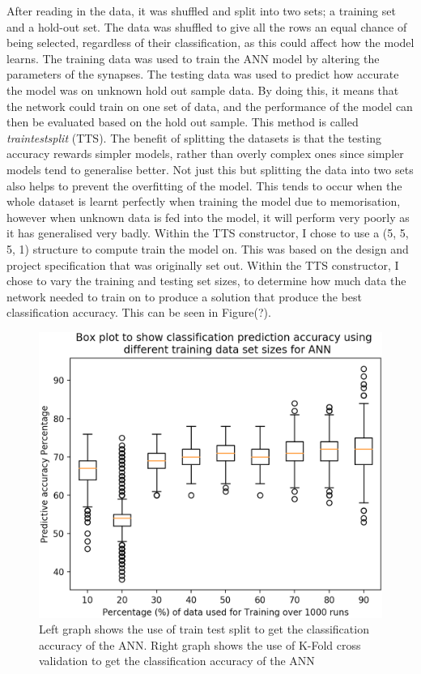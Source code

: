 \documentclass[11pt]{article}
\begin{document}
After reading in the data, it was shuffled and split into two sets;  a training set and a hold-out set. The data was shuffled to give all the rows an equal chance of being selected, regardless of their classification, as this could affect how the model learns.  The training data was used to train the ANN model by altering the parameters of the synapses. The testing data was used to predict how accurate the model was on unknown hold out sample data. By doing this, it means that the network could train on one set of data, and the performance of the model can then be evaluated based on the hold out sample. This method is called \textit{train\textunderscore test\textunderscore split} (TTS). The benefit of splitting the datasets is that the testing accuracy rewards simpler models, rather than overly complex ones since simpler models tend to generalise better. Not just this but splitting the data into two sets also helps to prevent the overfitting of the model. This tends to occur when the whole dataset is learnt perfectly when training the model due to memorisation, however when unknown data is fed into the model, it will perform very poorly as it has generalised very badly. 
Within the TTS constructor, I chose to use a (5, 5, 5, 1) structure to compute train the model on. This was based on the design and project specification that was originally set out. Within the TTS constructor, I chose to vary the training and testing set sizes, to determine how much data the network needed to train on to produce a solution that produce the best classification accuracy. This can be seen in Figure(?). 
\begin{figure}[h]
\centering
\includegraphics[scale = .50]{optTTS}
\caption{Left graph shows the use of train test split to get the classification accuracy of the ANN. Right graph shows the use of K-Fold cross validation to get the classification accuracy of the ANN} 
\end{figure}
\end{document}
